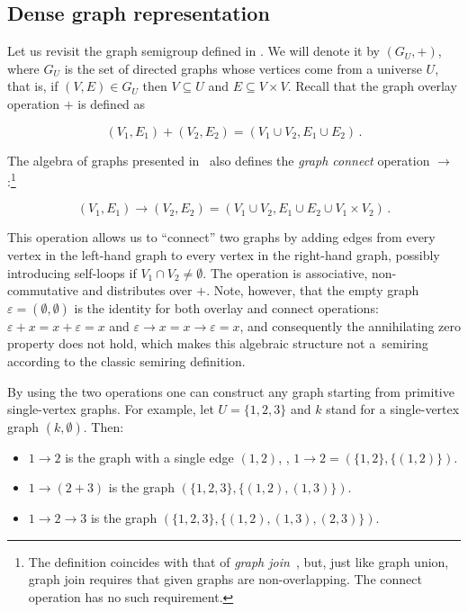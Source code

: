 \documentclass{toc}
\begin{document}
\subsection{Dense graph representation}\label{sec-dense-graph}

Let us revisit the graph semigroup defined in .
We will denote it by $(G_U, +)$, where $G_U$ is the set of directed graphs whose
vertices come from a universe $U$, that is, if $(V, E) \in G_U$ then
$V \subseteq U$ and $E \subseteq V \times V$. Recall that the graph overlay
operation $+$ is defined as

\[
(V_1, E_1) + (V_2, E_2) = (V_1 \cup V_2, E_1 \cup E_2)\,.
\]

\noindent
The algebra of graphs presented in~\cite{mokhov2017algebraic} also defines
the \emph{graph connect} operation $\rightarrow$:\footnote{The definition
    coincides with that of \emph{graph join}~\cite{1969_graph_theory_harary}, but,
    just like graph union, graph join requires that given graphs are
    non-overlapping. The connect operation has no such requirement.}

\[
(V_1, E_1) \rightarrow (V_2, E_2) = (V_1 \cup V_2, E_1 \cup E_2 \cup V_1 \times V_2)\,.
\]

This operation allows us to ``connect'' two graphs by adding edges from every
vertex in the left-hand graph to every vertex in the right-hand graph, possibly
introducing self-loops if $V_1 \cap V_2 \neq \emptyset$. The operation is
associative, non-commutative and distributes over $+$. Note, however, that the
empty graph $\varepsilon = (\emptyset, \emptyset)$ is the identity for both
overlay and connect operations: $\varepsilon + x = x + \varepsilon = x$ and
$\varepsilon \rightarrow x = x \rightarrow \varepsilon = x$, and consequently
the annihilating zero property does not hold, which makes this algebraic
structure not a~semiring according to the classic semiring definition.

By using the two operations one can construct any graph starting from primitive
single-vertex graphs. For example, let $U=\{1,2,3\}$ and $k$ stand for a
single-vertex graph $({k}, \emptyset)$. Then:

\begin{itemize}
    \item $1 \rightarrow 2$ is the graph with a single edge $(1,2)$, \ie, 
    $1 \rightarrow 2 = (\{1,2\}, \{(1,2)\})$.
    \item $1 \rightarrow (2 + 3)$ is the graph $(\{1,2,3\}, \{(1,2),(1,3)\})$.
    \item $1 \rightarrow 2 \rightarrow 3$ is the graph $(\{1,2,3\}, \{(1,2),(1,3),(2,3)\})$.
\end{itemize}
\end{document}
